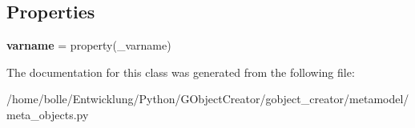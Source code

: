 \subsection*{Properties}
\begin{DoxyCompactItemize}
\item 
\hypertarget{classgobject__creator_1_1metamodel_1_1meta__objects_1_1Property_a34b9d9a2e4c4752e3f3fa7b39a1d04ce}{
{\bfseries varname} = property(\_\-varname)}
\label{classgobject__creator_1_1metamodel_1_1meta__objects_1_1Property_a34b9d9a2e4c4752e3f3fa7b39a1d04ce}

\end{DoxyCompactItemize}


The documentation for this class was generated from the following file:\begin{DoxyCompactItemize}
\item 
/home/bolle/Entwicklung/Python/GObjectCreator/gobject\_\-creator/metamodel/meta\_\-objects.py\end{DoxyCompactItemize}
